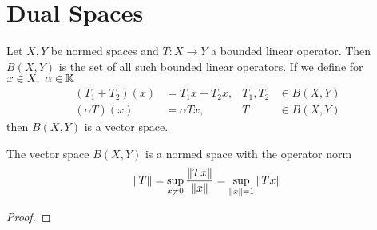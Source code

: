 \documentclass[../../script.tex]{subfiles}
\begin{document}
\section{Dual Spaces}

\begin{defi}
    Let $X, Y$ be normed spaces and $T: X \rightarrow Y$ a bounded linear operator. Then $B(X, Y)$ is the set of all such bounded linear operators.
    If we define for $x \in X, ~\alpha \in \mathbb{K}$
    \begin{align*}
        (T_1 + T_2)(x) &= T_1x + T_2x, & T_1, T_2 &\in B(X, Y) \\ 
        (\alpha T)(x) &= \alpha Tx, & T &\in B(X, Y)
    \end{align*}
    then $B(X, Y)$ is a vector space.
\end{defi}

\begin{thm}
    The vector space $B(X, Y)$ is a normed space with the operator norm 
    \[
        \norm{T} = \sup_{x \ne 0} \frac{\norm{Tx}}{\norm{x}} = \sup_{\norm{x} = 1} \norm{Tx}
    \]
\end{thm}
\begin{proof}
    \reader
\end{proof}
\end{document}
